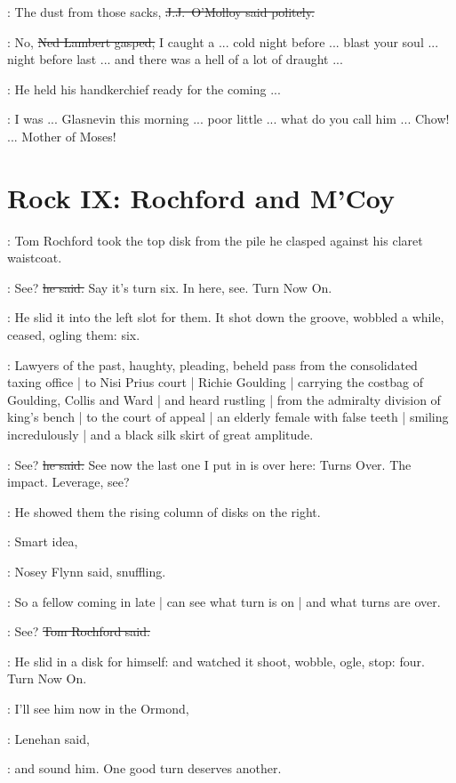 \jjom:
The dust from those sacks,
\sout{J.J.~O'Molloy said politely.}

\lambert:
No,
\sout{Ned Lambert gasped,}
I caught a ...
cold night before ...
blast your soul ...
night before last ...
and there was a hell of a lot of draught ...

:
He held his handkerchief ready for the coming ...

\lambert:
I was ...
Glasnevin this morning ...
poor little ...
what do you call him ...
Chow! ...
Mother of Moses!


\section*{Rock IX: Rochford and M'Coy}


:
Tom Rochford took the top disk from the pile
he clasped against his claret waistcoat.

\rochford:
See?
\sout{he said.}
Say it's turn six.
In here, see.
Turn Now On.

:
He slid it into the left slot for them.
It shot down the groove,
wobbled a while,
ceased,
ogling them:
six.

:
Lawyers of the past, haughty, pleading,
beheld pass from the consolidated taxing office |
to Nisi Prius court |
Richie Goulding |
carrying the costbag of Goulding, Collis and Ward |
and heard rustling |
from the admiralty division of king's bench |
to the court of appeal |
an elderly female with false teeth |
smiling incredulously |
and a black silk skirt of great amplitude.

\rochford:
See?
\sout{he said.}
See now the last one I put in is over here:
Turns Over.
The impact. Leverage, see?

:
He showed them the rising column of disks on the right.

\nosey:
Smart idea,

:
Nosey Flynn said, snuffling.

\nosey:
So a fellow coming in late |
can see what turn is on |
and what turns are over.

\rochford:
See?
\sout{Tom Rochford said.}

:
He slid in a disk for himself:
and watched it
shoot,
wobble,
ogle,
stop:
four.
Turn Now On.

\lenehan:
I'll see him now in the Ormond,

:
Lenehan said,

\lenehan:
and sound him.
One good turn deserves another.

